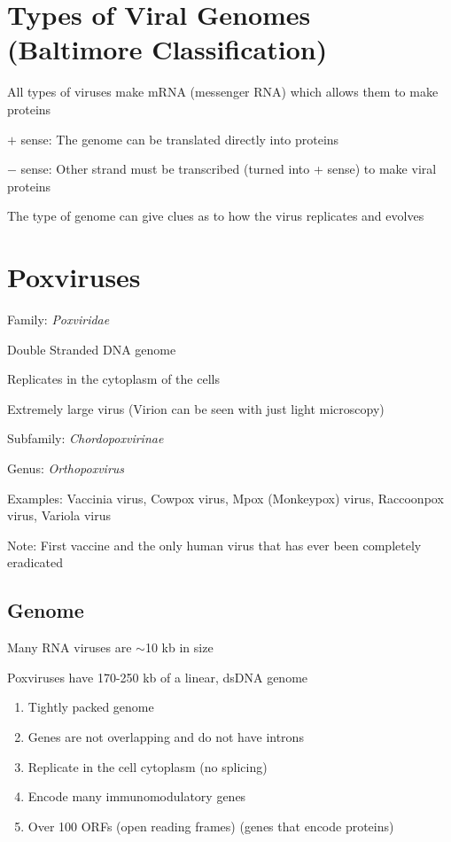 \documentclass{notes}
\begin{document}
\section{Types of Viral Genomes (Baltimore Classification)}

All types of viruses make mRNA (messenger RNA) which allows them to make proteins

\(+\) sense: The genome can be translated directly into proteins

\(-\) sense: Other strand must be transcribed (turned into + sense) to make viral proteins

The type of genome can give clues as to how the virus replicates and evolves


\section{Poxviruses}

Family: \textit{Poxviridae}

Double Stranded DNA genome

\tab Replicates in the cytoplasm of the cells

Extremely large virus (Virion can be seen with just light microscopy)

Subfamily: \textit{Chordopoxvirinae}

Genus: \textit{Orthopoxvirus}

Examples: Vaccinia virus, Cowpox virus, Mpox (Monkeypox) virus, Raccoonpox virus, Variola virus

Note: First vaccine and the only human virus that has ever been completely eradicated

\subsection{Genome}

Many RNA viruses are \(\sim\)10 kb in size

Poxviruses have 170-250 kb of a linear, dsDNA genome

\begin{enumerate}
    \item Tightly packed genome
    \item Genes are not overlapping and do not have introns
    \item Replicate in the cell cytoplasm (no splicing)
    \item Encode many immunomodulatory genes
    \item Over 100 ORFs (open reading frames) (genes that encode proteins)
\end{enumerate}
\end{document}
